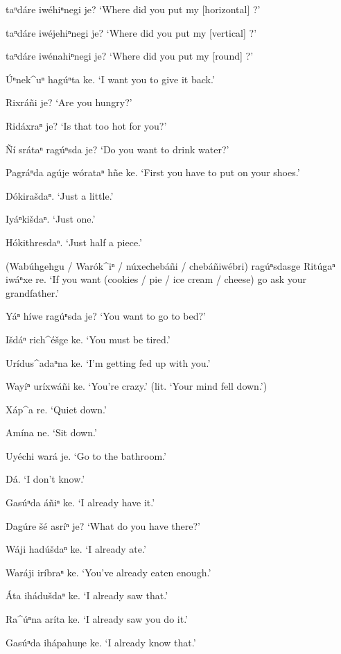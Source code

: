 \documentclass[output=paper]{LSP/langsci}
\begin{document}
\begin{list}{}{}
\item{\underline{\hspace{1em}} taⁿdáre iwéhiⁿnegi  je? `Where did you put my [horizontal] \underline{\hspace{1em}}?'}
\item{\underline{\hspace{1em}} taⁿdáre iwéjehiⁿnegi je? `Where did you put my [vertical] \underline{\hspace{1em}}?'}
\item{\underline{\hspace{1em}} taⁿdáre iwénahiⁿnegi je? `Where did you put my [round] \underline{\hspace{1em}}?'}
\item{\'Uⁿnek\^{ }uⁿ hagúⁿta ke. `I want you to give it back.'}

\item{Rixráñi je? `Are you hungry?'}
\item{Ridáxraⁿ je? `Is that too hot for you?'}
\item{\~Ní srátaⁿ ragúⁿsda je? `Do you want to drink water?'}
\item{Pagráⁿda agúje wórataⁿ hñe ke. `First you have to put on your shoes.'}
\item{Dókirašdaⁿ.	`Just a little.'}
\item{}
\item{Iyáⁿkišdaⁿ. `Just one.'}
\item{Hókithre{s}daⁿ. `Just half a piece.'}
\item{(Wabúhgehgu / Warók\^{ }iⁿ / núxechebáñi / chebáñiwébri) ragúⁿsdasge Ritúgaⁿ iwáⁿxe re. `If you want (cookies / pie / ice cream / cheese) go ask your grandfather.'}
\item{Yáⁿ híwe ragúⁿsda je? `You want to go to bed?'}
\item{Išdáⁿ rich\^{ }éšge ke. `You must be tired.'}
\item{}
\item{Urídus\^{ }adaⁿna ke. `I'm getting fed up with you.'}
\item{Wayíⁿ uríxwáñi ke. `You're crazy.' (lit. `Your mind fell down.')}
\item{Xáp\^{ }a re. `Quiet down.'}
\item{Amína ne. `Sit down.'	}
\item{Uyéchi wará je. `Go to the bathroom.'}
\item{}
\item{Dá.	`I don't know.'}
\item{Gasúⁿda áñiⁿ ke.	`I already have it.'}
\item{Dagúre šé asríⁿ je?	 `What do you have there?'}
\item{Wáji hadúšdaⁿ ke. `I already ate.'}
\item{Waráji iríbraⁿ ke. `You've already eaten enough.'}
\item{}
\item{\'Ata ihádušdaⁿ ke.	`I already saw that.'}
\item{Ra\^{ }úⁿna aríta ke.	`I already saw you do it.'}
\item{Gasúⁿda ihápahuŋe ke.	 `I already know that.'}
\item{}


\end{list}
\end{document}
